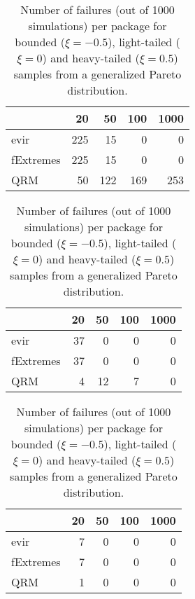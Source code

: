 \documentclass[
  letterpaper,
  DIV=11,
  numbers=noendperiod]{scrartcl}
\begin{document}
\begin{table}

\caption{\label{tbl-gpdnonconv}Number of failures (out of 1000
simulations) per package for bounded (\(\xi=-0.5\)), light-tailed
(\(\xi=0\)) and heavy-tailed (\(\xi=0.5\)) samples from a generalized
Pareto distribution.}\begin{minipage}[t]{\linewidth}

{\centering 

\tabularnewline

\centering
\begin{tabular}{lrrrr}
\toprule
  & 20 & 50 & 100 & 1000\\
\midrule
evir & 225 & 15 & 0 & 0\\
fExtremes & 225 & 15 & 0 & 0\\
QRM & 50 & 122 & 169 & 253\\
\bottomrule
\end{tabular}

}

\end{minipage}%
\newline
\begin{minipage}[t]{\linewidth}

{\centering 

\tabularnewline

\centering
\begin{tabular}{lrrrr}
\toprule
  & 20 & 50 & 100 & 1000\\
\midrule
evir & 37 & 0 & 0 & 0\\
fExtremes & 37 & 0 & 0 & 0\\
QRM & 4 & 12 & 7 & 0\\
\bottomrule
\end{tabular}

}

\end{minipage}%
\newline
\begin{minipage}[t]{\linewidth}

{\centering 

\tabularnewline

\centering
\begin{tabular}{lrrrr}
\toprule
  & 20 & 50 & 100 & 1000\\
\midrule
evir & 7 & 0 & 0 & 0\\
fExtremes & 7 & 0 & 0 & 0\\
QRM & 1 & 0 & 0 & 0\\
\bottomrule
\end{tabular}

}

\end{minipage}%

\end{table}
\end{document}
